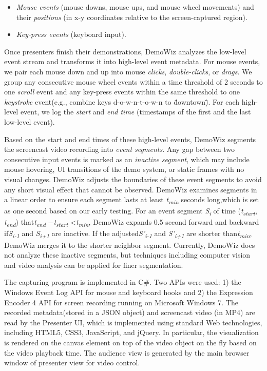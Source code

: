 \begin{itemize}
  \itemsep -2pt
  \item \textit{Mouse events} (mouse downs, mouse ups, and mouse wheel movements) and their \textit{positions} (in x-y coordinates relative to the screen-captured region).
  \item \textit{Key-press events} (keyboard input).
\end{itemize}

Once presenters finish their demonstrations, DemoWiz analyzes the low-level event stream and transforms it into high-level event metadata. For mouse events, we pair each mouse down and up into mouse \textit{clicks}, \textit{double-clicks}, or \textit{drags}. We group any consecutive mouse wheel events within a time threshold of 2 seconds to one \textit{scroll} event and any key-press events within the same threshold to one \textit{keystroke} event(e.g., combine keys d-o-w-n-t-o-w-n to \"downtown\"). For each high-level event, we log the \textit{start} and \textit{end time} (timestamps of the first and the last low-level event).

Based on the start and end times of these high-level events, DemoWiz segments the screencast video recording into \textit{event segments}. Any gap between two consecutive input events is marked as an \textit{inactive segment}, which may include mouse hovering, UI transitions of the demo system, or static frames with no visual changes. DemoWiz adjusts the boundaries of these event segments to avoid any short visual effect that cannot be observed. DemoWiz examines segments in a linear order to ensure each segment lasts at least \textit{t}\textit{\textsubscript{min}} seconds long,which is set as one second based on our early testing. For an event segment \textit{S}\textit{\textsubscript{i}} of time (\textit{t}\textit{\textsubscript{start}},\textit{ t}\textit{\textsubscript{end}}) that\textit{t}\textit{\textsubscript{end }}\textit{$-$t}\textit{\textsubscript{start}} {\textless}\textit{t}\textit{\textsubscript{min}}, DemoWiz expands 0.5 second forward and backward if\textit{S}\textit{\textsubscript{i-1}} and \textit{S}\textit{\textsubscript{i+1}} are inactive. If the adjusted\textit{S’}\textit{\textsubscript{i-1}} and \textit{S’}\textit{\textsubscript{i+1}}\textit{ }are shorter than\textit{t}\textit{\textsubscript{min}}, DemoWiz merges it to the shorter neighbor segment. Currently, DemoWiz does not analyze these inactive segments, but techniques including computer vision and video analysis \cite{Banovic:2012kd,Chi:2012:MAG:2380116.2380130} can be applied for finer segmentation.

The capturing program is implemented in C\#. Two APIs were used: 1) the Windows Event Log API for mouse and keyboard hooks and 2) the Expression Encoder 4 API for screen recording running on Microsoft Windows 7. The recorded metadata(stored in a JSON object) and screencast video (in MP4) are read by the Presenter UI, which is implemented using standard Web technologies, including HTML5, CSS3, JavaScript, and jQuery. In particular, the visualization is rendered on the canvas element on top of the video object on the fly based on the video playback time. The audience view is generated by the main browser window of presenter view for video control.
